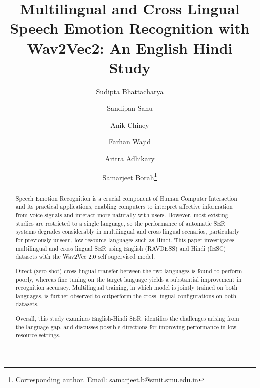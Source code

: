 \documentclass[runningheads]{llncs}
\begin{document}
\title{Multilingual and Cross Lingual Speech Emotion Recognition with Wav2Vec2: An English Hindi Study}


\author{Sudipta Bhattacharya \and
Sandipan Sahu \and
Anik Chiney \and
Farhan Wajid \and
Aritra Adhikary \and
Samarjeet Borah\thanks{Corresponding author. Email: samarjeet.b@smit.smu.edu.in}}



\maketitle

\begin{abstract}
Speech Emotion Recognition is a crucial component of Human Computer Interaction and its practical applications, enabling computers to interpret affective information from voice signals and interact more naturally with users. However, most existing studies are restricted to a single language, so the performance of automatic SER systems degrades considerably in multilingual and cross lingual scenarios, particularly for previously unseen, low resource languages such as Hindi. This paper investigates multilingual and cross lingual SER using English (RAVDESS) and Hindi (IESC) datasets with the Wav2Vec 2.0 self supervised model.

Direct (zero shot) cross lingual transfer between the two languages is found to perform poorly, whereas fine tuning on the target language yields a substantial improvement in recognition accuracy. Multilingual training, in which  model is jointly trained on both languages, is further observed to outperform the cross lingual configurations on both datasets.

Overall, this study examines English-Hindi SER, identifies the challenges arising from the language gap, and discusses possible directions for improving performance in low resource settings.

\end{abstract}
\end{document}
